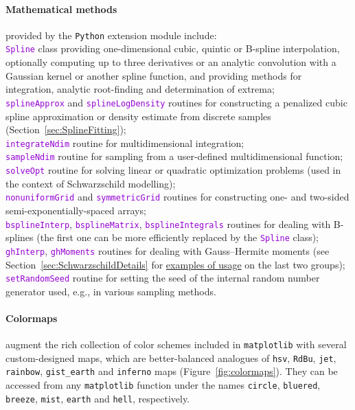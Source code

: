 \documentclass[12pt]{article}
\newcommand{\Python}{\texttt{Python}\xspace}
\newcommand{\ttt}[1]{\textcolor{darkviolet}{\texttt{#1}}}
\newcommand{\ppp}[1]{\textcolor{darkolive} {\texttt{#1}}}
\let\oldparagraph\paragraph
\renewcommand{\paragraph}[1]{\vspace{-2mm}\oldparagraph{#1}}
\begin{document}
\paragraph{Mathematical methods} provided by the \Python extension module include:\\
\ttt{Spline} class providing one-dimensional cubic, quintic or B-spline interpolation, optionally computing up to three derivatives or an analytic convolution with a Gaussian kernel or another spline function, and providing methods for integration, analytic root-finding and determination of extrema;\\
\ttt{splineApprox} and \ttt{splineLogDensity} routines for constructing a penalized cubic spline approximation or density estimate from discrete samples (Section~\ref{sec:SplineFitting});\\
\ttt{integrateNdim} routine for multidimensional integration;\\
\ttt{sampleNdim} routine for sampling from a user-defined multidimensional function;\\
\ttt{solveOpt} routine for solving linear or quadratic optimization problems (used in the context of Schwarzschild modelling);\\
\ttt{nonuniformGrid} and \ttt{symmetricGrid} routines for constructing one- and two-sided semi-exponentially-spaced arrays;\\
\ttt{bsplineInterp}, \ttt{bsplineMatrix}, \ttt{bsplineIntegrals} routines for dealing with B-splines (the first one can be more efficiently replaced by the \ttt{Spline} class);\\
\ttt{ghInterp}, \ttt{ghMoments} routines for dealing with Gauss--Hermite moments (see Section~\ref{sec:SchwarzschildDetails} for \hyperref[sec:SchwarzschildExample]{examples of usage} on the last two groups);\\
\ttt{setRandomSeed} routine for setting the seed of the internal random number generator used, e.g., in various sampling methods.

\paragraph{Colormaps} augment the rich collection of color schemes included in \texttt{matplotlib} with several custom-designed maps, which are better-balanced analogues of \texttt{hsv}, \texttt{RdBu}, \texttt{jet}, \texttt{rainbow}, \texttt{gist_earth} and \texttt{inferno} maps (Figure~\ref{fig:colormaps}). They can be accessed from any \texttt{matplotlib} function under the names \ppp{circle}, \ppp{bluered}, \ppp{breeze}, \ppp{mist}, \ppp{earth} and \ppp{hell}, respectively.
\end{document}
